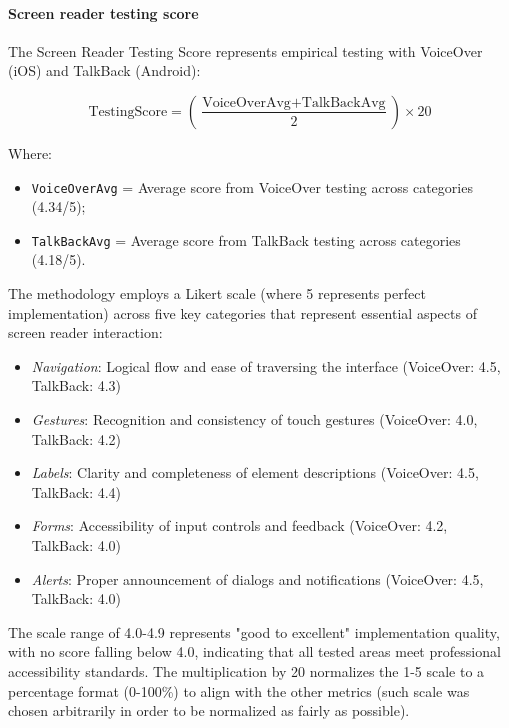 \FloatBarrier

\paragraph{Screen reader testing score}

The Screen Reader Testing Score represents empirical testing with VoiceOver (iOS) and TalkBack (Android):

\begin{equation}
\text{TestingScore} 
= \left(\frac{\text{VoiceOverAvg} + \text{TalkBackAvg}}{2}\right) \times 20
\end{equation}

Where:
\begin{itemize}
    \item \texttt{VoiceOverAvg} = Average score from VoiceOver testing across categories (4.34/5);
    \item \texttt{TalkBackAvg} = Average score from TalkBack testing across categories (4.18/5).
\end{itemize}

The methodology employs a Likert scale (where 5 represents perfect implementation) across five key categories that represent essential aspects of screen reader interaction:
\begin{itemize}
\item \textit{Navigation}: Logical flow and ease of traversing the interface (VoiceOver: 4.5, TalkBack: 4.3)
\item \textit{Gestures}: Recognition and consistency of touch gestures (VoiceOver: 4.0, TalkBack: 4.2)
\item \textit{Labels}: Clarity and completeness of element descriptions (VoiceOver: 4.5, TalkBack: 4.4)
\item \textit{Forms}: Accessibility of input controls and feedback (VoiceOver: 4.2, TalkBack: 4.0)
\item \textit{Alerts}: Proper announcement of dialogs and notifications (VoiceOver: 4.5, TalkBack: 4.0)
\end{itemize}

The scale range of 4.0-4.9 represents "good to excellent" implementation quality, with no score falling below 4.0, indicating that all tested areas meet professional accessibility standards. The multiplication by 20 normalizes the 1-5 scale to a percentage format (0-100\%) to align with the other metrics (such scale was chosen arbitrarily in order to be normalized as fairly as possible). 

